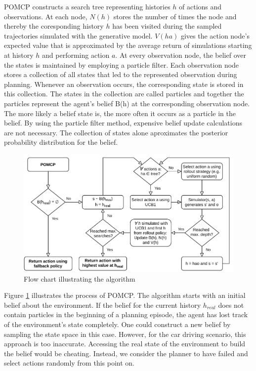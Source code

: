 
POMCP constructs a search tree representing histories $h$ of actions and observations. At each node, $N(h)$ stores the number of times the node and thereby the coresponding history $h$ has been visited during the sampled trajectories simulated with the generative model. $V(ha)$ gives the action node's expected value that is approximated by the average return of simulations starting at history $h$ and performing action $a$. At every observation node, the belief over the states is maintained by employing a particle filter. Each observation node stores a collection of all states that led to the represented observation during planning. Whenever an observation occurs, the corresponding state is stored in this collection. The states in the collection are called particles and together the particles represent the agent's belief B(h) at the corresponding observation node. The more likely a belief state is, the more often it occurs as a particle in the belief. By using the particle filter method, expensive belief update calculations are not necessary. The collection of states alone aproximates the posterior probability distribution for the belief.

\begin{figure}[htbp]
    \centerfloat
    \includegraphics[width=1.034\textwidth]{figures/POMCP.pdf}
    \caption{Flow chart illustrating the  algorithm}
    \label{fig:pomcp}
\end{figure}

Figure \ref{fig:pomcp} illustrates the process of POMCP. The algorithm starts with an initial belief about the environment. If the belief for the current history $h_{real}$ does not contain particles in the beginning of a planning episode, the agent has lost track of the environment's state completely. One could construct a new belief by sampling the state space in this case. However, for the car driving scenario, this approach is too inaccurate. Accessing the real state of the environment to build the belief would be cheating. Instead, we consider the planner to have failed and select actions randomly from this point on.

